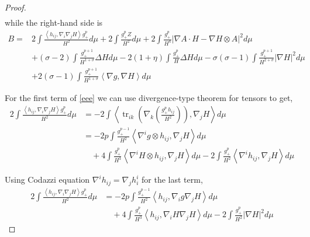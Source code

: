 \begin{proof}
\begin{align}
    \end{align}
    while the right-hand side is \begin{align}
       B =  & 2 \int \frac{\left< h_{ij}, \nabla_{i}\nabla_{j}H \right>g_{+}^{p}}{H^{2}}d \mu + 2 \int \frac{g_{+}^{p}Z}{H^{2}}d \mu + 2 \int \frac{g_{+}^{p}}{H^{4}}| \nabla A \cdot H - \nabla H \otimes A|^{2}d \mu \nonumber \\
        & + (\sigma-2)\int \frac{g_{+}^{p+1}}{H^{1+\sigma}}\Delta H d \mu -2(1+ \eta) \int \frac{g_{+}^{p}}{H}\Delta H d \mu  - \sigma(\sigma -1) \int \frac{g_{+}^{p+1}}{H^{2+\sigma}}|\nabla H|^{2}d \mu \nonumber\\
        & + 2(\sigma -1) \int \frac{g_{+}^{p+1}}{H^{1+\sigma}}\left< \nabla g, \nabla H \right>d \mu \label{eee}
    \end{align}

    For the first term of \cref{eee} we can use divergence-type theorem for tensors to get, \begin{align}
        2 \int \frac{\left< h_{ij}, \nabla_{i}\nabla_{j}H \right>g_{+}^{p}}{H^{2}}d \mu & = -2 \int \left<  \operatorname{tr}_{ik}\left( \nabla_{k} \left( \frac{g_{+}^{p}h_{ij}}{H^{2}} \right) \right), \nabla_{j}H \right> d \mu \nonumber\\
        & = -2p \int \frac{g_{+}^{p-1}}{H^{2}} \left<   \nabla^{i}g \otimes h_{ij}, \nabla_{j}H \right>d \mu \nonumber \\
        & \quad + 4 \int \frac{g_{+}^{p}}{H^{3}} \left< \nabla^{i}H \otimes h_{ij}, \nabla_{j}H  \right>d \mu - 2\int \frac{g_{+}^{p}}{H^{2}} \left< \nabla^{i}h_{ij}, \nabla_{j} H \right> d \mu 
    \end{align}

    Using Codazzi equation $ \nabla^{i}h_{ij} = \nabla_{j}h_{i}^{i} $ for the last term, 
    \begin{align}
        2 \int \frac{\left< h_{ij}, \nabla_{i}\nabla_{j}H \right>g_{+}^{p}}{H^{2}}d \mu & = -2p \int \frac{g_{+}^{p-1}}{H^{2}} \left< h_{ij}, \nabla_{i}g \nabla_{j}H \right>d \mu \nonumber \\
        & \quad + 4 \int \frac{g_{+}^{p}}{H^{3}} \left<  h_{ij}, \nabla_{i}H\nabla_{j}H  \right>d \mu -2 \int \frac{g_{+}^{p}}{H^{2}} |\nabla H|^{2}d \mu \label{fff}
    \end{align}


\end{proof}
